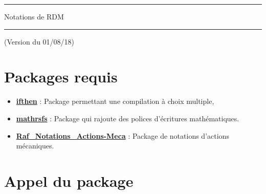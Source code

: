\documentclass[a4paper,10pt]{article}
\begin{document}
	\begin{center}
		\hrule{\Large Notations de RDM}\\\hrule
	\end{center}

	(Version du 01/08/18)

	\section{Packages requis}

	\begin{itemize}
		\item \href{http://www.ctan.org/pkg/ifthen}{\textbf{ifthen}} : Package permettant une compilation à choix multiple,
		\item \href{http://www.ctan.org/pkg/mathrsfs}{\textbf{mathrsfs}} : Package qui rajoute des polices d'écritures mathématiques.
		\item \href{http://enseignement.allais.eu/page-latex}{\textbf{Raf\_Notations\_Actions-Meca}} : Package de notations d'actions mécaniques.
	\end{itemize}

	\section{Appel du package}
\end{document}
